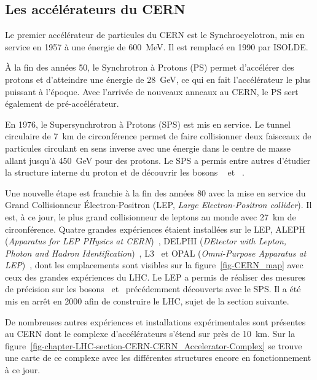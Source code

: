 \subsection{Les accélérateurs du CERN}
Le premier accélérateur de particules du CERN est le Synchrocyclotron, mis en service en 1957 à une énergie de \SI{600}{\MeV}.
Il est remplacé en 1990 par ISOLDE.
\par À la fin des années 50, le Synchrotron à Protons (PS) permet d'accélérer des protons et d'atteindre une énergie de \SI{28}{\GeV}, ce qui en fait l'accélérateur le plus puissant à l'époque.
Avec l'arrivée de nouveaux anneaux au CERN, le PS sert également de pré-accélérateur.
\par En 1976, le Supersynchrotron à Protons (SPS) est mis en service.
Le tunnel circulaire de \SI{7}{\kilo\meter} de circonférence permet de faire collisionner deux faisceaux de particules circulant en sens inverse avec une énergie dans le centre de masse allant jusqu'à \SI{450}{\GeV} pour des protons.
Le SPS a permis entre autres d'étudier la structure interne du proton et de découvrir les bosons
\Wboson~\cite{Wboson_discovery1,Wboson_discovery2,Wboson_discovery3}
et
\Zboson~\cite{Zboson_discovery1,Zboson_discovery2}.
\par Une nouvelle étape est franchie à la fin des années 80 avec la mise en service du Grand Collisionneur Électron-Positron (LEP, \emph{Large Electron-Positron collider}).
Il est, à ce jour, le plus grand collisionneur de leptons au monde avec \SI{27}{\kilo\meter} de circonférence.
Quatre grandes expériences étaient installées sur le LEP,
ALEPH (\emph{Apparatus for LEP PHysics at CERN})~\cite{aleph_paper},
DELPHI (\emph{DEtector with Lepton, Photon and Hadron Identification})~\cite{delphi_paper},
L3~\cite{l3_paper} et
OPAL (\emph{Omni-Purpose Apparatus at LEP})~\cite{opal_paper},
dont les emplacements sont visibles sur la figure~\ref{fig-CERN_map} avec ceux des grandes expériences du LHC.
Le LEP a permis de réaliser des mesures de précision sur les bosons \Wboson\ et \Zboson\ précédemment découverts avec le SPS.
Il a été mis en arrêt en 2000 afin de construire le LHC, sujet de la section suivante.
\par De nombreuses autres expériences et installations expérimentales sont présentes au CERN dont le complexe d'accélérateurs s'étend sur près de \SI{10}{\kilo\meter}.
Sur la figure~\ref{fig-chapter-LHC-section-CERN-CERN_Accelerator-Complex} se trouve une carte de ce complexe avec les différentes structures encore en fonctionnement à ce jour.
